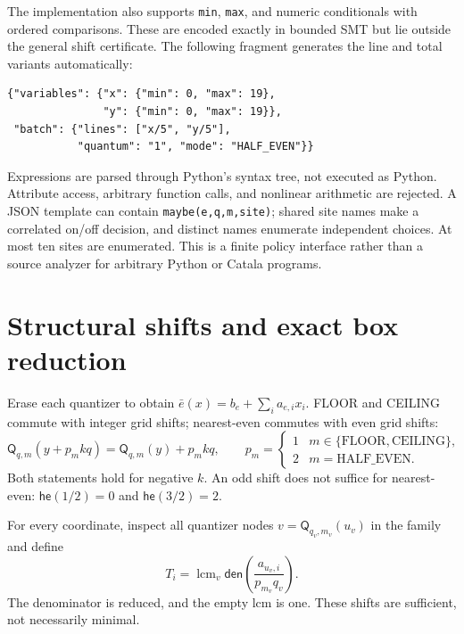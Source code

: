 \documentclass[11pt]{article}
\newcommand{\Q}{\mathsf{Q}}
\newcommand{\he}{\mathsf{he}}
\newcommand{\den}{\mathsf{den}}
\begin{document}
The implementation also supports \texttt{min}, \texttt{max}, and numeric conditionals with ordered comparisons. These are encoded exactly in bounded SMT but lie outside the general shift certificate. The following fragment generates the line and total variants automatically:
\begin{lstlisting}
{"variables": {"x": {"min": 0, "max": 19},
               "y": {"min": 0, "max": 19}},
 "batch": {"lines": ["x/5", "y/5"],
           "quantum": "1", "mode": "HALF_EVEN"}}
\end{lstlisting}
Expressions are parsed through Python's syntax tree, not executed as Python. Attribute access, arbitrary function calls, and nonlinear arithmetic are rejected. A JSON template can contain \texttt{maybe(e,q,m,site)}; shared site names make a correlated on/off decision, and distinct names enumerate independent choices. At most ten sites are enumerated. This is a finite policy interface rather than a source analyzer for arbitrary Python or Catala programs.

\section{Structural shifts and exact box reduction}
Erase each quantizer to obtain $\bar e(x)=b_e+\sum_i a_{e,i}x_i$. FLOOR and CEILING commute with integer grid shifts; nearest-even commutes with even grid shifts:
\begin{equation}\label{eq:translation}
 \Q_{q,m}(y+p_m kq)=\Q_{q,m}(y)+p_m kq,
 \qquad p_m=\begin{cases}1&m\in\{\mathrm{FLOOR},\mathrm{CEILING}\},\\2&m=\mathrm{HALF\_EVEN}.\end{cases}
\end{equation}
Both statements hold for negative $k$. An odd shift does not suffice for nearest-even: $\he(1/2)=0$ and $\he(3/2)=2$.

For every coordinate, inspect all quantizer nodes $v=\Q_{q_v,m_v}(u_v)$ in the family and define
\begin{equation}\label{eq:period}
 T_i=\mathop{\mathrm{lcm}}_v\den\!\left(\frac{a_{u_v,i}}{p_{m_v}q_v}\right).
\end{equation}
The denominator is reduced, and the empty lcm is one. These shifts are sufficient, not necessarily minimal.
\end{document}
